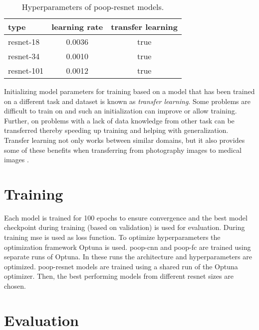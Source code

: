 \begin{table}[ht]
    \centering
    \caption[\Acs{poop}-\acs{resnet} hyperparameters]{Hyperparameters of \acs{poop}-\acs{resnet} models.}
    \begin{tabular}{ l c c }
        \hline
        type & learning rate & transfer learning\\
        \hline
        \acs{resnet}-18  & 0.0036 & true \\
        \acs{resnet}-34  & 0.0010 & true \\
        \acs{resnet}-101 & 0.0012 & true \\
    \end{tabular}
    \label{tab:Methods:Models:Comparison}
\end{table}

Initializing model parameters for training based on a model that has been trained on a different task and dataset is known as \emph{transfer learning}. Some problems are difficult to train on and such an initialization can improve or allow training. Further, on problems with a lack of data knowledge from other task can be transferred thereby speeding up training and helping with generalization. Transfer learning not only works between similar domains, but it also provides some of these benefits when transferring from photography images to medical images \cite{mustafa2021supervised}.


\section{Training}
\label{sec:Methods:Training}

Each model is trained for 100 epochs to ensure convergence and the best model checkpoint during training (based on validation) is used for evaluation. During training \ac{mse} is used as loss function. To optimize hyperparameters the optimization framework Optuna \cite{optuna} is used.
\Acs{poop}-\acs{cnn} and \acs{poop}-\acs{fc} are trained using separate runs of Optuna. In these runs the architecture and hyperparameters are optimized.
\Acs{poop}-\acs{resnet} models are trained using a shared run of the Optuna optimizer. Then, the best performing models from different \acs{resnet} sizes are chosen.


\section{Evaluation}
\label{sec:Methods:Evaluation}

